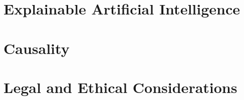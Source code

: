 

\section{Explainable Artificial Intelligence}\label{sec:xai}




\section{Causality}\label{sec:causalml}




\section{Legal and Ethical Considerations}\label{sec:legalethical}


